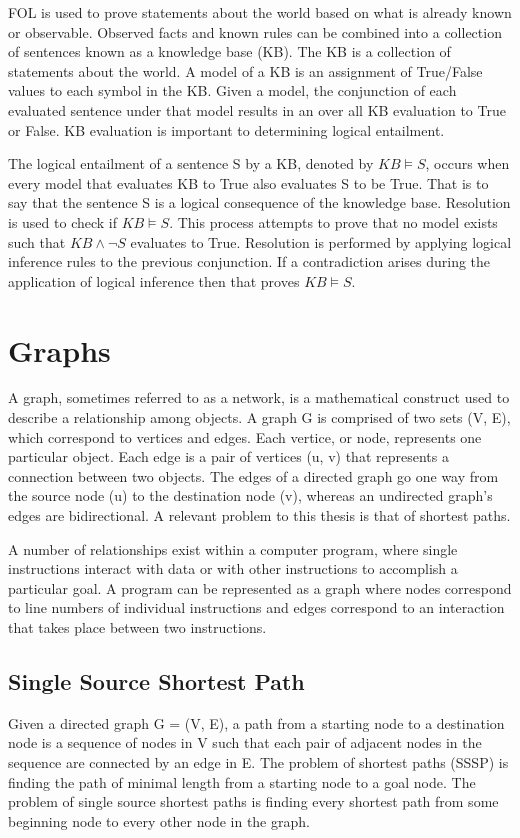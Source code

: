 FOL is used to prove statements about the world based on what is already known or observable. Observed facts and known rules can be combined into a collection of sentences known as a knowledge base (KB). The KB is a collection of statements about the world. A model of a KB is an assignment of True/False values to each symbol in the KB. Given a model, the conjunction of each evaluated sentence under that model results in an over all KB evaluation to True or False. KB evaluation is important to determining logical entailment.

The logical entailment of a sentence S by a KB, denoted by $KB \models S$, occurs when every model that evaluates KB to True also evaluates S to be True. That is to say that the sentence S is a logical consequence of the knowledge base. Resolution is used to check if $KB \models S$. This process attempts to prove that no model exists such that $KB \land \lnot S$ evaluates to True. Resolution is performed by applying logical inference rules to the previous conjunction. If a contradiction arises during the application of logical inference then that proves $KB \models S$.


\section{Graphs}
A graph, sometimes referred to as a network, is a mathematical construct used to describe a relationship among objects. A graph G is comprised of two sets (V, E), which correspond to vertices and edges. Each vertice, or node, represents one particular object. Each edge is a pair of vertices (u, v) that represents a connection between two objects. The edges of a directed graph go one way from the source node (u) to the destination node (v), whereas an undirected graph's edges are bidirectional. A relevant problem to this thesis is that of shortest paths.

A number of relationships exist within a computer program, where single instructions interact with data or with other instructions to accomplish a particular goal. A program can be represented as a graph where nodes correspond to line numbers of individual instructions and edges correspond to an interaction that takes place between two instructions.

\subsection{Single Source Shortest Path}
Given a directed graph G = (V, E), a path from a starting node to a destination node is a sequence of nodes in V such that each pair of adjacent nodes in the sequence are connected by an edge in E. The problem of shortest paths (SSSP) is finding the path of minimal length from a starting node to a goal node. The problem of single source shortest paths is finding every shortest path from some beginning node to every other node in the graph.

